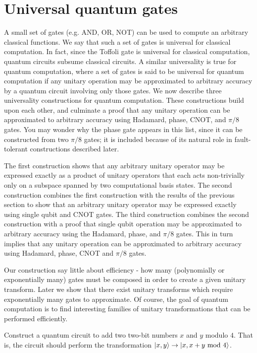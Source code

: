 \section{Universal quantum gates}
A small set of gates (e.g. AND, OR, NOT) can be used to compute an arbitrary classical functions. We say that such a set of gates is universal for classical computation. In fact, since the Toffoli gate is universal for classical computation, quantum circuits subsume classical circuits. A similar universality is true for quantum computation, where a set of gates is said to be universal for quantum computation if any unitary operation may be approximated to arbitrary accuracy by a quantum circuit involving only those gates. We now describe three universality constructions for quantum computation. These constructions build upon each other, and culminate a proof that any unitary operation can be approximated to arbitrary accuracy using Hadamard, phase, CNOT, and $\pi/8$ gates. You may wonder why the phase gate appears in this list, since it can be constructed from two $\pi/8$ gates; it is included because of its natural role in fault-tolerant constructions described later.

The first construction shows that any arbitrary unitary operator may be expressed exactly as a product of unitary operators that each acts non-trivially only on a subspace spanned by two computational basis states. The second construction combines the first construction with the results of the previous section to show that an arbitrary unitary operator may be expressed exactly using single qubit and CNOT gates. The third construction combines the second construction with a proof that single qubit operation may be approximated to arbitrary accuracy using the Hadamard, phase, and $\pi/8$ gates. This in turn implies that any unitary operation can be approximated to arbitrary accuracy using Hadamard, phase, CNOT and $\pi/8$ gates.

Our construction say little about efficiency - how many (polynomially or exponentially many) gates must be composed in order to create a given unitary transform. Later we show that there exist unitary transforms which require exponentially many gates to approximate. Of course, the goal of quantum computation is to find interesting families of unitary transformations that can be performed efficiently.

\begin{example}
    Construct a quantum circuit to add two two-bit numbers $x$ and $y$ modulo $4$. That is, the circuit should perform the transformation $\ket{x,y} \rightarrow \ket{x,x+y \text{ mod } 4}$.
\end{example}

